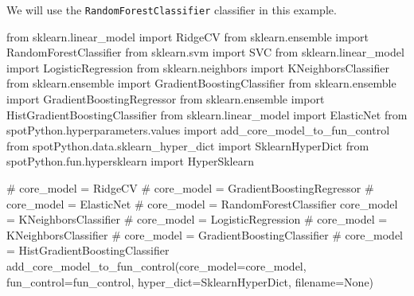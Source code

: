 \documentclass[
  letterpaper,
  DIV=11,
  numbers=noendperiod]{scrreprt}
\newenvironment{Shaded}{\begin{snugshade}}{\end{snugshade}}
\newcommand{\CommentTok}[1]{\textcolor[rgb]{0.37,0.37,0.37}{#1}}
\newcommand{\ImportTok}[1]{\textcolor[rgb]{0.00,0.46,0.62}{#1}}
\newcommand{\NormalTok}[1]{\textcolor[rgb]{0.00,0.23,0.31}{#1}}
\newcommand{\OperatorTok}[1]{\textcolor[rgb]{0.37,0.37,0.37}{#1}}
\newcommand{\VariableTok}[1]{\textcolor[rgb]{0.07,0.07,0.07}{#1}}
\begin{document}
We will use the \texttt{RandomForestClassifier} classifier in this
example.

\begin{Shaded}
\begin{Highlighting}[]
\ImportTok{from}\NormalTok{ sklearn.linear\_model }\ImportTok{import}\NormalTok{ RidgeCV}
\ImportTok{from}\NormalTok{ sklearn.ensemble }\ImportTok{import}\NormalTok{ RandomForestClassifier}
\ImportTok{from}\NormalTok{ sklearn.svm }\ImportTok{import}\NormalTok{ SVC}
\ImportTok{from}\NormalTok{ sklearn.linear\_model }\ImportTok{import}\NormalTok{ LogisticRegression}
\ImportTok{from}\NormalTok{ sklearn.neighbors }\ImportTok{import}\NormalTok{ KNeighborsClassifier}
\ImportTok{from}\NormalTok{ sklearn.ensemble }\ImportTok{import}\NormalTok{ GradientBoostingClassifier}
\ImportTok{from}\NormalTok{ sklearn.ensemble }\ImportTok{import}\NormalTok{ GradientBoostingRegressor}
\ImportTok{from}\NormalTok{ sklearn.ensemble }\ImportTok{import}\NormalTok{ HistGradientBoostingClassifier}
\ImportTok{from}\NormalTok{ sklearn.linear\_model }\ImportTok{import}\NormalTok{ ElasticNet}
\ImportTok{from}\NormalTok{ spotPython.hyperparameters.values }\ImportTok{import}\NormalTok{ add\_core\_model\_to\_fun\_control}
\ImportTok{from}\NormalTok{ spotPython.data.sklearn\_hyper\_dict }\ImportTok{import}\NormalTok{ SklearnHyperDict}
\ImportTok{from}\NormalTok{ spotPython.fun.hypersklearn }\ImportTok{import}\NormalTok{ HyperSklearn}
\end{Highlighting}
\end{Shaded}

\begin{Shaded}
\begin{Highlighting}[]
\CommentTok{\# core\_model  = RidgeCV}
\CommentTok{\# core\_model = GradientBoostingRegressor}
\CommentTok{\# core\_model = ElasticNet}
\CommentTok{\# core\_model = RandomForestClassifier}
\NormalTok{core\_model }\OperatorTok{=}\NormalTok{ KNeighborsClassifier}
\CommentTok{\# core\_model = LogisticRegression}
\CommentTok{\# core\_model = KNeighborsClassifier}
\CommentTok{\# core\_model = GradientBoostingClassifier}
\CommentTok{\# core\_model = HistGradientBoostingClassifier}
\NormalTok{add\_core\_model\_to\_fun\_control(core\_model}\OperatorTok{=}\NormalTok{core\_model,}
\NormalTok{                              fun\_control}\OperatorTok{=}\NormalTok{fun\_control,}
\NormalTok{                              hyper\_dict}\OperatorTok{=}\NormalTok{SklearnHyperDict,}
\NormalTok{                              filename}\OperatorTok{=}\VariableTok{None}\NormalTok{)}
\end{Highlighting}
\end{Shaded}
\end{document}
